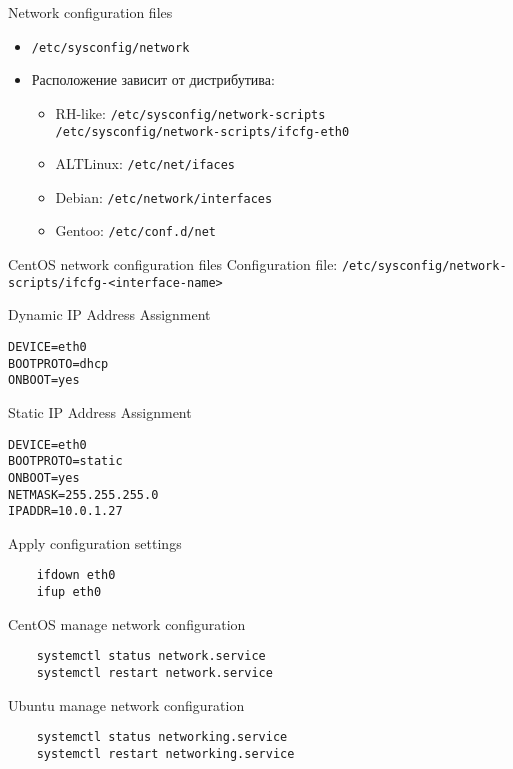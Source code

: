 \begin{frame}{Network configuration files}
  \begin{itemize}
    \item {\tt /etc/sysconfig/network}
    \item Расположение зависит от дистрибутива:
        \begin{itemize}
            \item RH-like: {\tt /etc/sysconfig/network-scripts}\\
                {\tt /etc/sysconfig/network-scripts/ifcfg-eth0}
            \item ALTLinux: {\tt /etc/net/ifaces}
            \item Debian: {\tt /etc/network/interfaces}
            \item Gentoo: {\tt /etc/conf.d/net}
        \end{itemize}
  \end{itemize}
\end{frame}

\begin{frame}[fragile]{CentOS network configuration files}
Configuration file: {\tt /etc/sysconfig/network-scripts/ifcfg-<interface-name> }

\begin{block}{Dynamic IP Address Assignment}
    \begin{lstlisting}
DEVICE=eth0
BOOTPROTO=dhcp
ONBOOT=yes
    \end{lstlisting}
\end{block}

\begin{block}{Static IP Address Assignment}
    \begin{lstlisting}
DEVICE=eth0
BOOTPROTO=static
ONBOOT=yes
NETMASK=255.255.255.0
IPADDR=10.0.1.27
    \end{lstlisting}
\end{block}
\end{frame}

\begin{frame}[fragile]{Apply configuration settings}
    \begin{lstlisting}
    ifdown eth0
    ifup eth0
    \end{lstlisting}
    CentOS manage network configuration
    \begin{lstlisting}
    systemctl status network.service
    systemctl restart network.service
    \end{lstlisting}
    Ubuntu manage network configuration
    \begin{lstlisting}
    systemctl status networking.service
    systemctl restart networking.service
    \end{lstlisting}
\end{frame}



